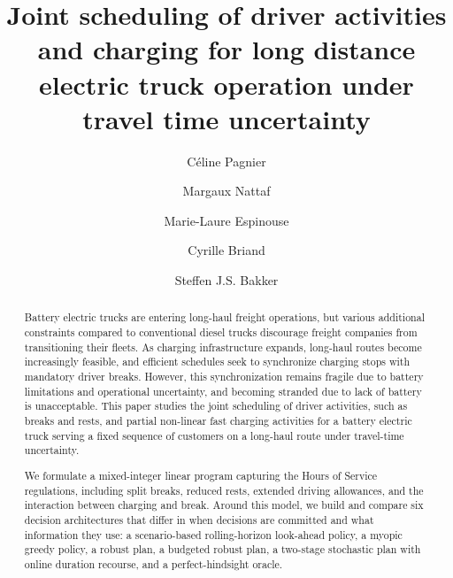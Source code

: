 \documentclass[preprint,12pt,3p]{elsarticle}
\begin{document}
\begin{frontmatter}
\title{Joint scheduling of driver activities and charging for long distance electric truck operation under travel time uncertainty}

\author[inst1, label1]{C\'eline Pagnier}
\author[inst2]{Margaux Nattaf}
\author[inst2]{Marie-Laure Espinouse}
\author[inst3]{Cyrille Briand}
\author[inst1]{Steffen J.S. Bakker}


\begin{abstract}
Battery electric trucks are entering long-haul freight operations, but various additional constraints compared to conventional diesel trucks discourage freight companies from transitioning their fleets.
As charging infrastructure expands, long-haul routes become increasingly feasible, and efficient schedules seek to synchronize charging stops with mandatory driver breaks. However, this synchronization remains fragile due to battery limitations and operational uncertainty, and becoming stranded due to lack of battery is unacceptable.
This paper studies the joint scheduling of driver activities, such as breaks and rests, and partial non-linear fast charging activities for a battery electric truck serving a fixed sequence of customers on a long-haul route under travel-time uncertainty.

We formulate a mixed-integer linear program capturing the Hours of Service regulations, including split breaks, reduced rests, extended driving allowances, and the interaction between charging and break. Around this model, we build and compare six decision architectures that differ in when decisions are committed and what information they use: a scenario-based rolling-horizon look-ahead policy, a myopic greedy policy, a robust plan, a budgeted robust plan, a two-stage stochastic plan with online duration recourse, and a perfect-hindsight oracle.


\end{abstract}
\end{frontmatter}
\end{document}
